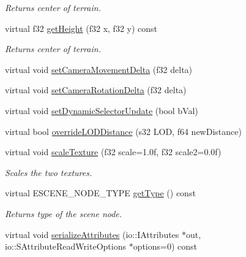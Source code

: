 \begin{DoxyCompactItemize}
\begin{DoxyCompactList}\small\item\em Returns center of terrain. \end{DoxyCompactList}\item 
virtual f32 \hyperlink{classirr_1_1scene_1_1_c_terrain_scene_node_ab406b0b5c2acbd5c6048314345682a8b}{get\-Height} (f32 x, f32 y) const 
\begin{DoxyCompactList}\small\item\em Returns center of terrain. \end{DoxyCompactList}\item 
virtual void \hyperlink{classirr_1_1scene_1_1_c_terrain_scene_node_aa098919c643b088d6ff93c79fbd02b07}{set\-Camera\-Movement\-Delta} (f32 delta)
\item 
virtual void \hyperlink{classirr_1_1scene_1_1_c_terrain_scene_node_a9a8b1191a069e7b085383be5a9aaf947}{set\-Camera\-Rotation\-Delta} (f32 delta)
\item 
virtual void \hyperlink{classirr_1_1scene_1_1_c_terrain_scene_node_acb114e9d0c2f48b31ca07d9cb57b7c60}{set\-Dynamic\-Selector\-Update} (bool b\-Val)
\item 
virtual bool \hyperlink{classirr_1_1scene_1_1_c_terrain_scene_node_ae7f41826b0842b235948e7155361edb8}{override\-L\-O\-D\-Distance} (s32 L\-O\-D, f64 new\-Distance)
\item 
virtual void \hyperlink{classirr_1_1scene_1_1_c_terrain_scene_node_ab601dacdc758a052340fb2e2ecbdb256}{scale\-Texture} (f32 scale=1.\-0f, f32 scale2=0.\-0f)
\begin{DoxyCompactList}\small\item\em Scales the two textures. \end{DoxyCompactList}\item 
\hypertarget{classirr_1_1scene_1_1_c_terrain_scene_node_a50f186786d3cb925d73c1ba474695012}{virtual E\-S\-C\-E\-N\-E\-\_\-\-N\-O\-D\-E\-\_\-\-T\-Y\-P\-E \hyperlink{classirr_1_1scene_1_1_c_terrain_scene_node_a50f186786d3cb925d73c1ba474695012}{get\-Type} () const }\label{classirr_1_1scene_1_1_c_terrain_scene_node_a50f186786d3cb925d73c1ba474695012}

\begin{DoxyCompactList}\small\item\em Returns type of the scene node. \end{DoxyCompactList}\item 
\hypertarget{classirr_1_1scene_1_1_c_terrain_scene_node_aaf110dbd297b4b03ebe590d7c759ba66}{virtual void \hyperlink{classirr_1_1scene_1_1_c_terrain_scene_node_aaf110dbd297b4b03ebe590d7c759ba66}{serialize\-Attributes} (io\-::\-I\-Attributes $\ast$out, io\-::\-S\-Attribute\-Read\-Write\-Options $\ast$options=0) const }\label{classirr_1_1scene_1_1_c_terrain_scene_node_aaf110dbd297b4b03ebe590d7c759ba66}


\end{DoxyCompactItemize}
